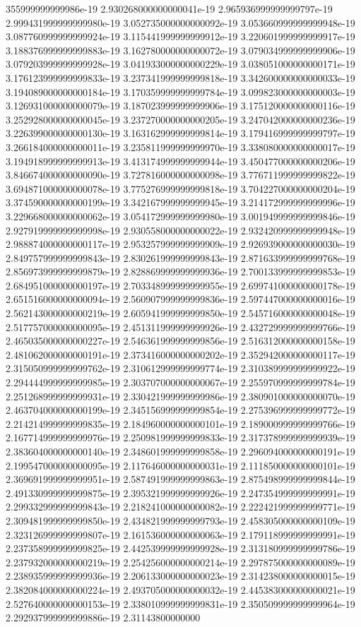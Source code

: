 355999999999986e-19	2.930268000000000041e-19	2.965936999999999797e-19	2.999431999999999980e-19	3.052735000000000092e-19	3.053660999999999948e-19	3.087760999999999924e-19	3.115441999999999912e-19	3.220601999999999917e-19	3.188376999999999883e-19	3.162780000000000072e-19	3.079034999999999906e-19	3.079203999999999928e-19	3.041933000000000229e-19	3.038051000000000171e-19	3.176123999999999833e-19	3.237341999999999818e-19	3.342600000000000033e-19	3.194089000000000184e-19	3.170359999999999784e-19	3.099823000000000003e-19	3.126931000000000079e-19	3.187023999999999906e-19	3.175120000000000116e-19	3.252928000000000045e-19	3.237270000000000205e-19	3.247042000000000236e-19	3.226399000000000130e-19	3.163162999999999814e-19	3.179416999999999797e-19	3.266184000000000011e-19	3.235811999999999970e-19	3.338080000000000017e-19	3.194918999999999913e-19	3.413174999999999944e-19	3.450477000000000206e-19	3.846674000000000090e-19	3.727816000000000098e-19	3.776711999999999822e-19	3.694871000000000078e-19	3.775276999999999818e-19	3.704227000000000204e-19	3.374590000000000199e-19	3.342167999999999945e-19	3.214172999999999996e-19	3.229668000000000062e-19	3.054172999999999980e-19	3.001949999999999846e-19	2.927919999999999998e-19	2.930558000000000022e-19	2.932420999999999948e-19	2.988874000000000117e-19	2.953257999999999909e-19	2.926939000000000030e-19	2.849757999999999843e-19	2.830261999999999843e-19	2.871633999999999768e-19	2.856973999999999879e-19	2.828869999999999936e-19	2.700133999999999853e-19	2.684951000000000197e-19	2.703348999999999955e-19	2.699741000000000178e-19	2.651516000000000094e-19	2.560907999999999836e-19	2.597447000000000016e-19	2.562143000000000219e-19	2.605941999999999850e-19	2.545716000000000048e-19	2.517757000000000095e-19	2.451311999999999926e-19	2.432729999999999766e-19	2.465035000000000227e-19	2.546361999999999856e-19	2.516312000000000158e-19	2.481062000000000191e-19	2.373416000000000202e-19	2.352942000000000117e-19	2.315050999999999762e-19	2.310612999999999774e-19	2.310389999999999922e-19	2.294444999999999985e-19	2.303707000000000067e-19	2.255970999999999784e-19	2.251268999999999931e-19	2.330421999999999986e-19	2.380901000000000070e-19	2.463704000000000199e-19	2.345156999999999854e-19	2.275396999999999772e-19	2.214214999999999835e-19	2.184960000000000101e-19	2.189000999999999766e-19	2.167714999999999976e-19	2.250981999999999833e-19	2.317378999999999939e-19	2.383604000000000140e-19	2.348601999999999858e-19	2.296094000000000191e-19	2.199547000000000095e-19	2.117646000000000031e-19	2.111850000000000101e-19	2.369691999999999951e-19	2.587491999999999863e-19	2.875498999999999844e-19	2.491330999999999875e-19	2.395321999999999926e-19	2.247354999999999991e-19	2.299332999999999843e-19	2.218241000000000082e-19	2.222421999999999771e-19	2.309481999999999850e-19	2.434821999999999793e-19	2.458305000000000109e-19	2.323126999999999807e-19	2.161536000000000063e-19	2.179118999999999991e-19	2.237358999999999825e-19	2.442539999999999928e-19	2.313180999999999786e-19	2.237932000000000219e-19	2.254256000000000214e-19	2.297875000000000089e-19	2.238935999999999936e-19	2.206133000000000023e-19	2.314238000000000015e-19	2.382084000000000224e-19	2.493705000000000032e-19	2.445383000000000021e-19	2.527640000000000153e-19	2.338010999999999831e-19	2.350509999999999964e-19	2.292937999999999886e-19	2.31143800000000